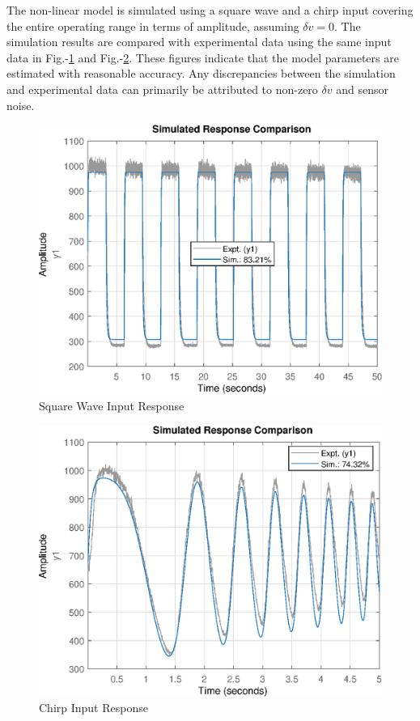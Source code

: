 The non-linear model is simulated using a square wave and a chirp input
covering the entire operating range in terms of amplitude, assuming $\delta v =
0$. The simulation results are compared with experimental data using the
same input data in Fig.-\ref{fig::sq_valid} and Fig.-\ref{fig::chirp_valid}.
These figures indicate that the model parameters are estimated with reasonable
accuracy. Any discrepancies between the simulation and experimental data can
primarily be attributed to non-zero $\delta v$ and sensor noise.

\begin{minipage}{0.49\textwidth}
 \begin{figure}[H]
    \centering
    \includegraphics[width = \textwidth]{Part2/figs/3_figs/nl_valid/square_validation.eps}
    \caption{Square Wave Input Response}
    \label{fig::sq_valid}
\end{figure}
\end{minipage}
\begin{minipage}{0.49\textwidth}
\begin{figure}[H]
    \centering
    \includegraphics[width = \textwidth]{Part2/figs/3_figs/nl_valid/chirp_validation.eps}
    \caption{Chirp Input Response}
    \label{fig::chirp_valid}
\end{figure}
\end{minipage}
